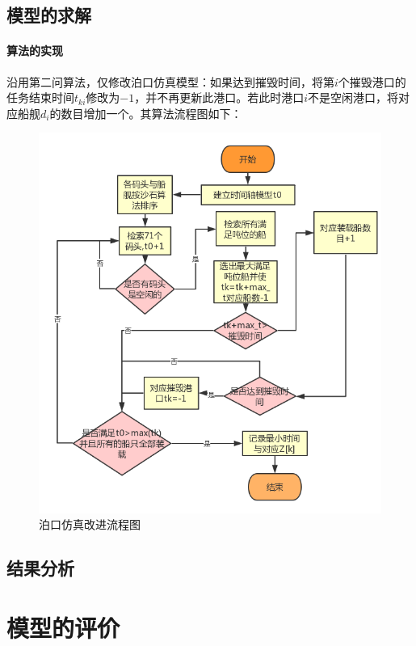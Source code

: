 \documentclass{whutmod}
\begin{document}
       \subsection{模型的求解}
     \paragraph{算法的实现}

	沿用第二问算法，仅修改泊口仿真模型：如果达到摧毁时间，将第$i$个摧毁港口的任务结束时间$t_{ki}$修改为$-1$，并不再更新此港口。若此时港口$i$不是空闲港口，将对应船舰$d_{i}$的数目增加一个。其算法流程图如下：
    \begin{figure}[H]
	\centering
	\includegraphics[width=\textwidth]{figures/yyyy.png}
	\caption{泊口仿真改进流程图}\label{dieyyrywen}
\end{figure}

	

	
	\subsection{结果分析}
     



	\section{模型的评价}
\end{document}
